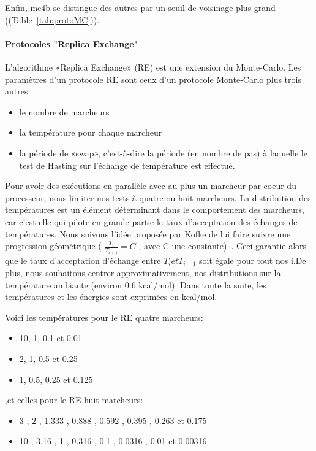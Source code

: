 Enfin, mc4b se distingue des autres par un seuil de voisinage plus grand ((Table~\ref{tab:protoMC})).

   \paragraph{Protocoles "Replica Exchange"} 

L'algorithme «Replica Exchange» (RE) est une extension du Monte-Carlo. Les paramètres d'un protocole RE sont ceux d'un protocole Monte-Carlo plus trois autres:

\begin{itemize}
\item le nombre de marcheurs
\item la température pour chaque marcheur
\item la période de «swap», c'est-à-dire la période (en nombre de pas) à laquelle le test de Hasting sur l'échange de température est effectué.
\end{itemize}
Pour avoir des exécutions en parallèle avec au plus un marcheur par coeur du processeur, nous limiter nos tests à quatre ou huit marcheurs.
La distribution des températures est un élément déterminant dans le comportement des marcheurs, car c'est elle qui pilote en grande partie le taux d'acceptation des échanges de températures. Nous suivons l'idée proposée par Kofke de lui faire suivre une progression géométrique ( $ \frac{T_i}{T_{i+1}}=C $ , avec C une constante)~\citep{refRE1,refRE2,refRE3}. Ceci garantie alors que le taux d'acceptation d'échange entre $T_i et T_{i+1}$ soit égale pour tout nos i.De plus, nous souhaitons centrer approximativement, nos distributions sur la température ambiante (environ 0.6 kcal/mol). Dans toute la suite, les températures et les énergies sont exprimées en kcal/mol.

Voici les températures pour le RE quatre marcheurs:

\begin{itemize} 
\item 10, 1, 0.1 et 0.01
\item 2, 1, 0.5 et 0.25 
\item 1, 0.5, 0.25 et 0.125
\end{itemize} 

,et celles pour le RE huit marcheurs:

\begin{itemize} 
\item 3 , 2 , 1.333 , 0.888 , 0.592 , 0.395 , 0.263 et 0.175 
\item 10 , 3.16 , 1 , 0.316 , 0.1 , 0.0316 , 0.01 et 0.00316
\end{itemize} 

